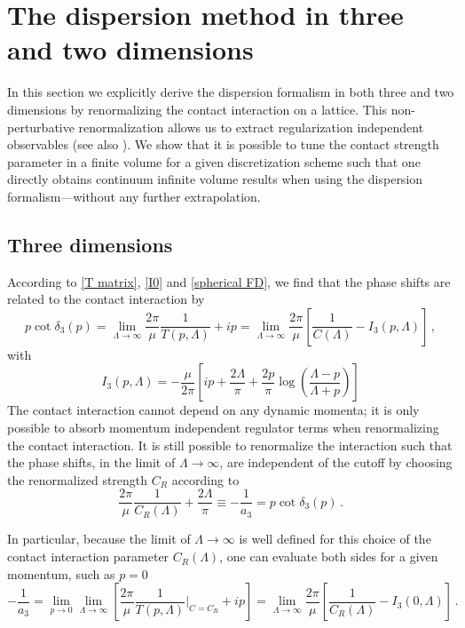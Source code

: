 \section{The dispersion method in three and two dimensions}\label{sec:3D dispersion}
In this section we explicitly derive the dispersion formalism in both three and two dimensions by renormalizing the contact interaction on a lattice.
This non-perturbative renormalization allows us to extract regularization independent observables (see also ).
We show that it is possible to tune the contact strength parameter in a finite volume for a given discretization scheme such that one directly obtains continuum infinite volume results when using the dispersion formalism---without any further extrapolation.

\subsection{Three dimensions}

According to \eqref{T matrix}, \eqref{I0} and \eqref{spherical FD}, we find that the phase shifts are related to the contact interaction by
\begin{equation}\label{eq:blah blah}
	p \cot \delta_3(p)
	= \lim\limits_{\Lambda \to \infty}\frac{2 \pi}{\mu}\frac{1}{T(p, \Lambda)} + i p
	= \lim\limits_{\Lambda \to \infty}
		\frac{2 \pi}{\mu} \left[
			\frac{1}{C(\Lambda)} - I_3(p, \Lambda)
		\right]
	\, ,
\end{equation}
with
\begin{equation}
	I_3(p, \Lambda)
	=
	-\frac{\mu}{2 \pi}
	\left[
	i p + \frac{2 \Lambda}{\pi} + \frac{2  p}{\pi} \log \left( \frac{\Lambda - p}{\Lambda + p}\right)
	\right]
\end{equation}
The contact interaction cannot depend on any dynamic momenta; it is only possible to absorb momentum independent regulator terms when renormalizing the contact interaction.
It is still possible to renormalize the interaction such that the phase shifts, in the limit of $\Lambda \to \infty$, are independent of the cutoff by choosing the renormalized strength $C_R$ according to
\begin{equation}\label{eq:three-d-counterterm}
	\frac{2 \pi}{\mu} \frac{1}{C_R(\Lambda)} + \frac{2 \Lambda}{\pi}
	\equiv
	- \frac{1}{a_3}
	=
	p \cot \delta_3(p)
	\, .
\end{equation}

In particular, because the limit of $\Lambda \to \infty$ is well defined for this choice of the contact interaction parameter $C_R(\Lambda)$, one can evaluate both sides for a given momentum, such as $p=0$
\begin{equation}
	- \frac{1}{a_3}
	=
	\lim\limits_{p \to 0}\lim\limits_{\Lambda \to \infty}
		\left[
			\frac{2 \pi}{\mu}\frac{1}{T(p, \Lambda)} \bigg|_{C=C_R} + i p
	\right]
	=
	\lim\limits_{\Lambda \to \infty}
	\frac{2 \pi}{\mu}
		\left[
		\frac{1}{C_R(\Lambda)} - I_3(0, \Lambda)
		\right]
	\, .
\end{equation}


